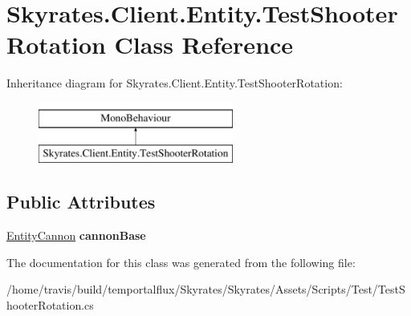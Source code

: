 \hypertarget{class_skyrates_1_1_client_1_1_entity_1_1_test_shooter_rotation}{\section{Skyrates.\-Client.\-Entity.\-Test\-Shooter\-Rotation Class Reference}
\label{class_skyrates_1_1_client_1_1_entity_1_1_test_shooter_rotation}
}
Inheritance diagram for Skyrates.\-Client.\-Entity.\-Test\-Shooter\-Rotation\-:\begin{figure}[H]
\begin{center}
\leavevmode
\includegraphics[height=2.000000cm]{class_skyrates_1_1_client_1_1_entity_1_1_test_shooter_rotation}
\end{center}
\end{figure}
\subsection*{Public Attributes}
\begin{DoxyCompactItemize}
\item 
\hypertarget{class_skyrates_1_1_client_1_1_entity_1_1_test_shooter_rotation_acee70056acffe234672d46ce9d324314}{\hyperlink{class_skyrates_1_1_entity_1_1_entity_cannon}{Entity\-Cannon} {\bfseries cannon\-Base}}\label{class_skyrates_1_1_client_1_1_entity_1_1_test_shooter_rotation_acee70056acffe234672d46ce9d324314}

\end{DoxyCompactItemize}


The documentation for this class was generated from the following file\-:\begin{DoxyCompactItemize}
\item 
/home/travis/build/temportalflux/\-Skyrates/\-Skyrates/\-Assets/\-Scripts/\-Test/Test\-Shooter\-Rotation.\-cs\end{DoxyCompactItemize}
